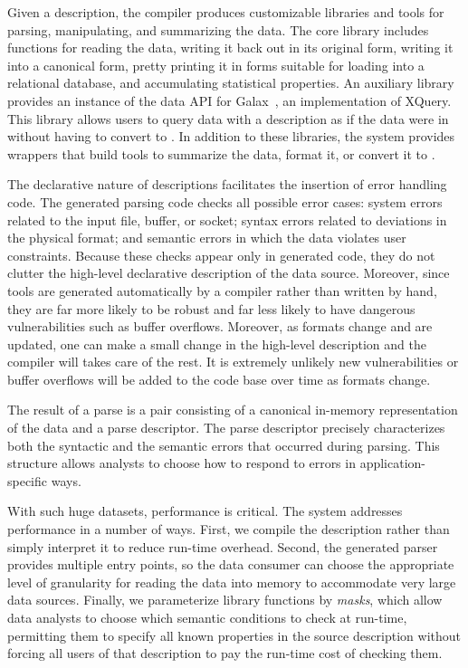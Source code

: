 \documentclass[11pt]{article}
\begin{document}
Given a \pads{} description, the \pads{} compiler produces
customizable \C{} libraries and tools for parsing, manipulating, and
summarizing the data.  The core \C{} library includes functions for
reading the data, writing it back out in its original form, writing it
into a canonical \xml{} form, pretty printing it in forms suitable for
loading into a relational database, and accumulating statistical
properties.  An auxiliary library provides an instance of the data API
for Galax~\cite{galax,galaxmanual}, an implementation of XQuery.  This
library allows users to query data with a \pads{} description as if
the data were in \xml{} without having to convert to \xml{}.  In
addition to these libraries, the \pads{} system provides wrappers that
build tools to summarize the data, format it, or convert it to \xml{}.

The declarative nature of \pads{} descriptions facilitates the
insertion of error handling code.  The generated parsing code checks
all possible error cases: system errors related to the input file,
buffer, or socket; syntax errors related to deviations in the physical
format; and semantic errors in which the data violates user
constraints.  Because these checks appear only in generated code, they
do not clutter the high-level declarative description of the data
source.  Moreover, since tools are generated
automatically by a compiler rather than written by hand, 
they are far more likely to be robust
and far less likely to have dangerous vulnerabilities such as
buffer overflows.  Moreover, as formats change and are updated,
one can make a small change in the high-level description
and the compiler will takes care of the rest.  It is extremely unlikely
new vulnerabilities or buffer overflows will be added to the code
base over time as formats change.

The result of a parse is a pair consisting of a canonical
in-memory representation of the data and a parse descriptor. The parse
descriptor precisely characterizes both the syntactic and the semantic
errors that occurred during parsing.  This structure allows analysts
to choose how to respond to errors in application-specific ways.

With such huge datasets, performance is critical. The \pads{} system
addresses performance in a number of ways.  First, we compile the
\pads{} description rather than simply interpret it to reduce run-time
overhead.  Second, the generated parser provides multiple entry
points, so the data consumer can choose the appropriate level of
granularity for reading the data into memory to accommodate very large
data sources.  Finally, we parameterize library functions by
\textit{masks}, which allow data analysts to choose which semantic
conditions to check at run-time, permitting them to specify all known
properties in the source description without forcing all users of that
description to pay the run-time cost of checking them.
\end{document}
